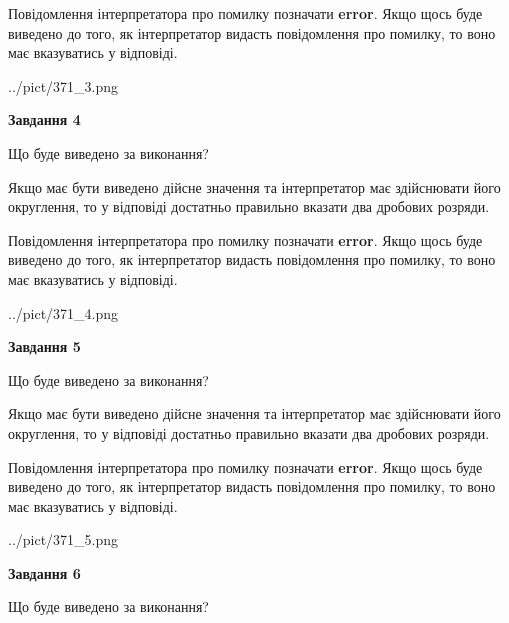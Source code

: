 \documentclass[12pt, ukrainian]{article}
\begin{document}
{\begin {Large}
Повідомлення інтерпретатора про помилку позначати \textbf{error}.
Якщо щось буде виведено до того, як інтерпретатор видасть повідомлення про помилку, 
то воно має вказуватись у відповіді. \par

\begin{center}
	{../pict/371_3.png}
\end{center}
\newpage

{\begin {center}\textbf{Завдання 4}\end {center}}\par
Що буде виведено за виконання? \par

Якщо має бути виведено дійсне значення та інтерпретатор має здійснювати його округлення, 
то у відповіді достатньо правильно вказати два дробових розряди.

Повідомлення інтерпретатора про помилку позначати \textbf{error}.
Якщо щось буде виведено до того, як інтерпретатор видасть повідомлення про помилку, 
то воно має вказуватись у відповіді. \par

\begin{center}
	{../pict/371_4.png}
\end{center}
\newpage

{\begin {center}\textbf{Завдання 5}\end {center}}\par
Що буде виведено за виконання? \par

Якщо має бути виведено дійсне значення та інтерпретатор має здійснювати його округлення, 
то у відповіді достатньо правильно вказати два дробових розряди.

Повідомлення інтерпретатора про помилку позначати \textbf{error}.
Якщо щось буде виведено до того, як інтерпретатор видасть повідомлення про помилку, 
то воно має вказуватись у відповіді. \par

\begin{center}
	{../pict/371_5.png}
\end{center}
\newpage

{\begin {center}\textbf{Завдання 6}\end {center}}\par
Що буде виведено за виконання? \par


\end{Large}}
\end{document}
